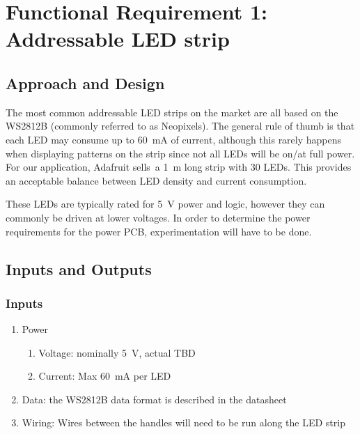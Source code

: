 \documentclass{notes}
\begin{document}
\section{Functional Requirement 1: Addressable LED strip}

\subsection{Approach and Design}

The most common addressable LED strips on the market are all based on the WS2812B (commonly referred to as Neopixels).
The general rule of thumb is that each LED may consume up to \SI{60}{\milli\ampere} of current, although this rarely happens when displaying patterns on the strip since not all LEDs will be on/at full power.
For our application, Adafruit sells\footnotemark\ a \SI{1}{\meter} long strip with 30 LEDs.
This provides an acceptable balance between LED density and current consumption.

These LEDs are typically rated for \SI{5}{\volt} power and logic, however they can commonly be driven at lower voltages.
In order to determine the power requirements for the power PCB, experimentation will have to be done.

\subsection{Inputs and Outputs}

\subsubsection{Inputs}

\begin{enumerate}
    \item Power
    \begin{enumerate}
        \item Voltage: nominally \SI{5}{\volt}, actual TBD
        \item Current: Max \SI{60}{\milli\ampere} per LED
    \end{enumerate}
    \item Data: the WS2812B data format is described in the datasheet\footnotemark
    \item Wiring: Wires between the handles will need to be run along the LED strip
\end{enumerate}
\end{document}
